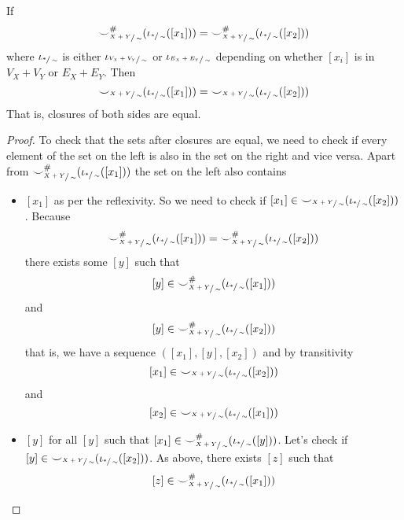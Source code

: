 \begin{lemma}
\label{lemma:closures_of_equal_sets_are_equal}
If
\[
{\smile}_{\sfrac{X+Y}{\sim}}^{{\#}}(\iota_{\sfrac{*}{\sim}}([x_1])) = {\smile}_{\sfrac{X+Y}{\sim}}^{{\#}}(\iota_{\sfrac{*}{\sim}}([x_2]))
\]
where $\iota_{\sfrac{*}{\sim}}$ is either $\iota_{\sfrac{V_{X} + V_{Y}}{\sim}}$ or $\iota_{\sfrac{E_{X} + E_{Y}}{\sim}}$ depending on whether $[x_i]$ is in $V_{X} + V_{Y}$ or $E_{X} + E_{Y}$.
Then
\[
{\smile}_{\sfrac{X+Y}{\sim}}(\iota_{\sfrac{*}{\sim}}([x_1])) = {\smile}_{\sfrac{X+Y}{\sim}}(\iota_{\sfrac{*}{\sim}}([x_2]))
\]
That is, closures of both sides are equal.
\end{lemma}

\begin{proof}
    To check that the sets after closures are equal, we need to check if every element of the set on the left is also in the set on the right and vice versa.
    Apart from ${\smile}_{\sfrac{X+Y}{\sim}}^{{\#}}(\iota_{\sfrac{*}{\sim}}([x_1]))$ the set on the left also contains
    \begin{itemize}
        \item $[x_1]$ as per the reflexivity.
        So we need to check if $[x_1] \in {\smile}_{\sfrac{X+Y}{\sim}}(\iota_{\sfrac{*}{\sim}}([x_2]))$.
              Because 
              \[
              {\smile}_{\sfrac{X+Y}{\sim}}^{{\#}}(\iota_{\sfrac{*}{\sim}}([x_1])) = {\smile}_{\sfrac{X+Y}{\sim}}^{{\#}}(\iota_{\sfrac{*}{\sim}}([x_2]))
              \]
              there exists some $[y]$ such that 
              \[
              [y] \in {\smile}_{\sfrac{X+Y}{\sim}}^{{\#}}(\iota_{\sfrac{*}{\sim}}([x_1]))
              \]
               and
            \[
                [y] \in {\smile}_{\sfrac{X+Y}{\sim}}^{{\#}}(\iota_{\sfrac{*}{\sim}}([x_2]))
            \]
            that is, we have a sequence $([x_1],[y],[x_2])$ and by transitivity
               \[
               [x_1] \in {\smile}_{\sfrac{X+Y}{\sim}}(\iota_{\sfrac{*}{\sim}}([x_2]))
               \]
                and
            \[
            [x_2] \in {\smile}_{\sfrac{X+Y}{\sim}}(\iota_{\sfrac{*}{\sim}}([x_1]))
            \]
        \item $[y]$ for all $[y]$ such that $[x_1] \in {\smile}_{\sfrac{X+Y}{\sim}}^{{\#}}(\iota_{\sfrac{*}{\sim}}([y]))$.
              Let's check if $[y] \in {\smile}_{\sfrac{X+Y}{\sim}}(\iota_{\sfrac{*}{\sim}}([x_2]))$.
              As above, there exists $[z]$ such that
              \[
              [z] \in {\smile}_{\sfrac{X+Y}{\sim}}^{{\#}}(\iota_{\sfrac{*}{\sim}}([x_1]))
\]
\end{itemize}
\end{proof}
